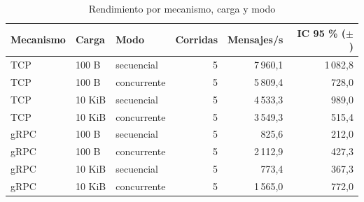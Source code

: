 \begin{table}[htbp]
\centering
\small
\caption{Rendimiento por mecanismo, carga y modo}
\label{tab:rendimiento}
\begin{tabular}{lllrrr}
\hline
Mecanismo & Carga & Modo & Corridas & Mensajes/s & IC 95 \% ($\pm$) \\
\hline
TCP & 100 B & secuencial & 5 & 7\,960,1 & 1\,082,8 \\
TCP & 100 B & concurrente & 5 & 5\,809,4 & 728,0 \\
TCP & 10 KiB & secuencial & 5 & 4\,533,3 & 989,0 \\
TCP & 10 KiB & concurrente & 5 & 3\,549,3 & 515,4 \\
gRPC & 100 B & secuencial & 5 & 825,6 & 212,0 \\
gRPC & 100 B & concurrente & 5 & 2\,112,9 & 427,3 \\
gRPC & 10 KiB & secuencial & 5 & 773,4 & 367,3 \\
gRPC & 10 KiB & concurrente & 5 & 1\,565,0 & 772,0 \\
\hline
\end{tabular}
\end{table}
